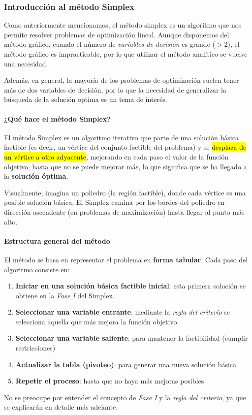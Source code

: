 \subsubsection{Introducción al método Simplex}

Como anteriormente mencionamos, el método simplex es un algoritmo que nos permite resolver problemas de optimización lineal. Aunque disponemos del método gráfico, cuando el número de \textit{variables de decisión} es grande (\(> 2\)), el método gráfico es impracticable, por lo que utilizar el método analítico se vuelve una necesidad.

Además, en general, la mayoría de los problemas de optimización suelen tener más de dos variables de decisión, por lo que la necesidad de generalizar la búsqueda de la solución optima es un tema de interés.

\paragraph{¿Qué hace el método Simplex?}

El método Simplex es un algoritmo iterativo que parte de una solución básica factible (es decir, un vértice del conjunto factible del problema) y se \hl{desplaza de un vértice a otro adyacente}, mejorando en cada paso el valor de la función objetivo, hasta que no se puede mejorar más, lo que significa que se ha llegado a la \textbf{solución óptima}.

Visualmente, imagina un poliedro (la región factible), donde cada vértice es una posible solución básica. El Simplex camina por los bordes del poliedro en dirección ascendente (en problemas de maximización) hasta llegar al punto más alto.

\paragraph{Estructura general del método}

El método se basa en representar el problema en \textbf{forma tabular}. Cada paso del algoritmo consiste en:
\begin{enumerate}
  \item \textbf{Iniciar en una solución básica factible inicial}: esta primera solución se obtiene en la \textit{Fase I} del Simplex. 
  \item \textbf{Seleccionar una variable entrante}: mediante la \textit{regla del criterio} se selecciona aquella que más mejora la función objetivo
  \item \textbf{Seleccionar una variable saliente}: para mantener la factibilidad (cumplir restricciones)
  \item \textbf{Actualizar la tabla (pivoteo)}: para generar una nueva solución básica
  \item \textbf{Repetir el proceso}: hasta que no haya más mejoras posibles
\end{enumerate} 
No se preocupe por entender el concepto de \textit{Fase I} y la \textit{regla del criterio}, ya que se explicarán en detalle más adelante.

